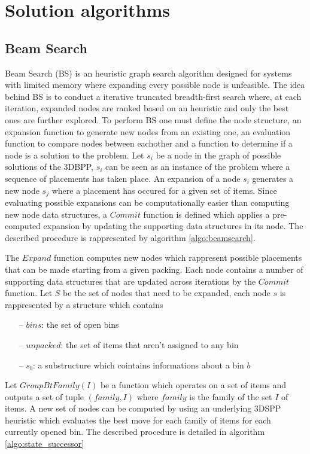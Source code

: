 \chapter{Solution algorithms}\label{chapter:heuristics}
\section{Beam Search}\label{chapter:heuristics:beamsearch}
Beam Search (BS) %
is an heuristic graph search algorithm designed for systems with limited memory where expanding every possible node is unfeasible.
The idea behind BS is to conduct a iterative truncated breadth-first search where, at each iteration, expanded nodes are ranked based on an heuristic and only the best ones are further explored.
To perform BS one must define the node structure, an expansion function to generate new nodes from an existing one, an evaluation function to compare nodes between eachother and a function to determine if a node is a solution to the problem.
Let $s_i$ be a node in the graph of possible solutions of the 3DBPP, %
$s_i$ can be seen as an instance of the problem where a sequence of placements has taken place.
An expansion of a node $s_i$ generates a new node $s_j$ where a placement has occured for a given set of items.
Since evaluating possible expansions can be computationally easier than computing new node data structures, %
a $Commit$ function is defined which applies a pre-computed expansion by updating the supporting data structures in its node.
The described procedure is rappresented by algorithm \ref{algo:beamsearch}.



The $Expand$ function computes new nodes which rappresent possible placements that can be made starting from a given packing.
Each node contains a number of supporting data structures that are updated across iterations by the $Commit$ function.
Let $S$ be the set of nodes that need to be expanded, each node $s$ is rappresented by a structure which contains
\begin{itemize}
    \item[--] $bins$: the set of open bins
    \item[--] $unpacked$: the set of items that aren't assigned to any bin
    \item[--] $s_b$: a substructure which cointains informations about a bin $b$
\end{itemize}
Let $GroupBtFamily(I)$ be a function which operates on a set of items and outputs a set of tuple $(family, I)$ where $family$ is the family of the set $I$ of items. %
A new set of nodes can be computed by using an underlying 3DSPP heuristic which evaluates the best move for each family of items for each currently opened bin.
The described procedure is detailed in algorithm \ref{algo:state_successor}  

